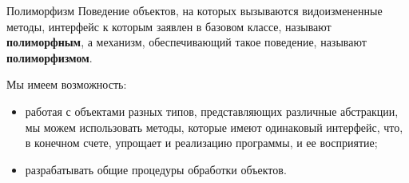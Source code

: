 \documentclass{beamer}
\begin{document}
\begin{frame}{Полиморфизм}
Поведение объектов, на которых вызываются видоизмененные методы, интерфейс к которым заявлен в базовом классе, называют \textbf{полиморфным}, а механизм, обеспечивающий такое поведение, называют \textbf{полиморфизмом}.

Мы имеем возможность:
\begin{itemize}
\item работая с объектами разных типов, представляющих различные абстракции, мы можем использовать методы, которые имеют одинаковый интерфейс, что, в конечном счете, упрощает и реализацию программы, и ее восприятие;
\item разрабатывать общие процедуры обработки объектов.
\end{itemize}
\end{frame}
\end{document}
